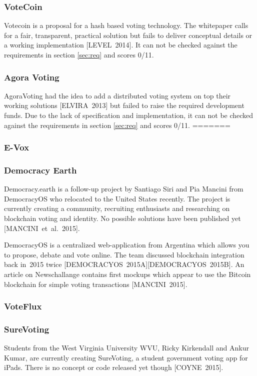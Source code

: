 \documentclass[9pt,oneside]{amsart}
\begin{document}
\begin{multicols}{2}
\subsubsection{VoteCoin}
Votecoin is a proposal for a hash based voting technology. The whitepaper calls for a fair, transparent, practical solution but fails to deliver conceptual details or a working implementation [LEVEL~2014]. It can not be checked against the requirements in section \ref{sec:req} and scores 0/11.

\subsubsection{Agora Voting}
AgoraVoting had the idea to add a distributed voting system on top their working solutions [ELVIRA~2013] but failed to raise the required development funds. Due to the lack of specification and implementation, it can not be checked against the requirements in section \ref{sec:req} and scores 0/11.
=======
\subsubsection{E-Vox}

\subsubsection{Democracy Earth}
Democracy.earth is a follow-up project by Santiago Siri and Pia Mancini from DemocracyOS who relocated to the United States recently. The project is currently creating a community, recruiting enthusiasts and researching on blockchain voting and identity. No possible solutions have been published yet [MANCINI~et~al.~2015].\par
DemocracyOS is a centralized web-application from Argentina which allows you to propose, debate and vote online. The team discussed blockchain integration back in~2015 twice [DEMOCRACYOS~2015A][DEMOCRACYOS~2015B]. An article on Newschallange contains first mockups which appear to use the Bitcoin blockchain for simple voting transactions [MANCINI~2015].

\subsubsection{VoteFlux}

\subsubsection{SureVoting}
Students from the West Virginia University WVU, Ricky Kirkendall and Ankur Kumar, are currently creating SureVoting, a student government voting app for iPads. There is no concept or code released yet though [COYNE~2015].


\end{multicols}
\end{document}
